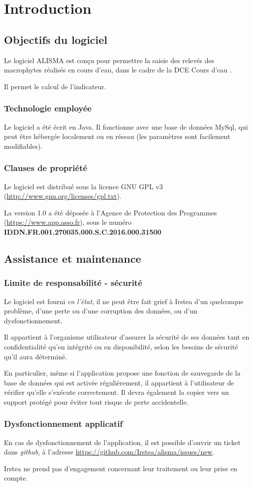 \chapter{Introduction}

\section{Objectifs du logiciel}
Le logiciel ALISMA est conçu pour permettre la saisie des relevés des macrophytes réalisés en cours d'eau, dans le cadre de la DCE \og Cours d'eau \fg{}. 

Il permet le calcul de l'indicateur.
\subsection{Technologie employée}
Le logiciel a été écrit en Java. Il fonctionne avec une base de données MySql, qui peut être hébergée localement ou en réseau (les paramètres sont facilement modifiables).
\subsection{Clauses de propriété}
Le logiciel est distribué sous la licence GNU GPL v3 (\url{http://www.gnu.org/licenses/gpl.txt}).

La version 1.0 a été déposée à l'Agence de Protection des Programmes (\url{https://www.app.asso.fr}), sous le numéro \textbf{IDDN.FR.001.270035.000.S.C.2016.000.31500}

\section{Assistance et maintenance}

\subsection{Limite de responsabilité - sécurité}

Le logiciel est fourni \textit{en l'état}, il ne peut être fait grief à Irstea d'un quelconque problème, d'une perte ou d'une corruption des données, ou d'un dysfonctionnement.

Il appartient à l'organisme utilisateur d'assurer la sécurité de ses données tant en confidentialité qu'en intégrité ou en disponibilité, selon les besoins de sécurité qu'il aura déterminé. 

En particulier, même si l'application propose une fonction de sauvegarde de la base de données qui est activée régulièrement, il appartient à l'utilisateur de vérifier qu'elle s'exécute correctement. Il devra également la copier vers un support protégé pour éviter tout risque de perte accidentelle.

\subsection{Dysfonctionnement applicatif}

En cas de dysfonctionnement de l'application, il est possible d'ouvrir un ticket dans \textit{github}, à l'adresse \url{https://github.com/Irstea/alisma/issues/new}.

Irstea ne prend pas d'engagement concernant leur traitement ou leur prise en compte.
